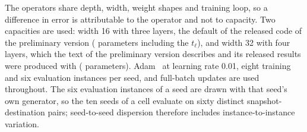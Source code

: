 \documentclass[preprint,11pt,3p]{elsarticle}
\begin{document}
The operators share depth, width, weight shapes and training loop, so a difference in error is
attributable to the operator and not to capacity. Two capacities are used: width 16 with three
layers, the default of the released code of the preliminary version (\numReleasedParams{}
parameters including the $t_{\ell}$), and width 32 with four layers, which the text of the
preliminary version describes and its released results were produced with
(\numSubmittedParams{} parameters). Adam~\cite{adam} at learning rate 0.01, eight training and six
evaluation instances per seed, and full-batch updates are used throughout. The six evaluation
instances of a seed are drawn with that seed's own generator, so the ten seeds of a cell evaluate
on sixty distinct snapshot-destination pairs; seed-to-seed dispersion therefore includes
instance-to-instance variation.
\end{document}
